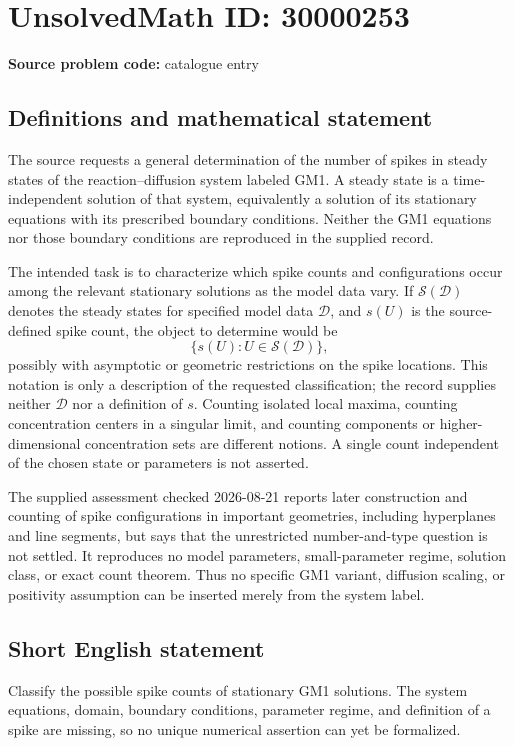 \documentclass[11pt]{article}
\begin{document}
\section*{UnsolvedMath ID: 30000253}
\textbf{Source problem code:} catalogue entry
\subsection{Definitions and mathematical statement}
The source requests a general determination of the number of spikes in steady states of the reaction--diffusion system labeled GM1. A steady state is a time-independent solution of that system, equivalently a solution of its stationary equations with its prescribed boundary conditions. Neither the GM1 equations nor those boundary conditions are reproduced in the supplied record.

The intended task is to characterize which spike counts and configurations occur among the relevant stationary solutions as the model data vary. If \(\mathcal S(\mathcal D)\) denotes the steady states for specified model data \(\mathcal D\), and \(s(U)\) is the source-defined spike count, the object to determine would be
\[
\{s(U):U\in\mathcal S(\mathcal D)\},
\]
possibly with asymptotic or geometric restrictions on the spike locations. This notation is only a description of the requested classification; the record supplies neither \(\mathcal D\) nor a definition of \(s\). Counting isolated local maxima, counting concentration centers in a singular limit, and counting components or higher-dimensional concentration sets are different notions. A single count independent of the chosen state or parameters is not asserted.

The supplied assessment checked 2026-08-21 reports later construction and counting of spike configurations in important geometries, including hyperplanes and line segments, but says that the unrestricted number-and-type question is not settled. It reproduces no model parameters, small-parameter regime, solution class, or exact count theorem. Thus no specific GM1 variant, diffusion scaling, or positivity assumption can be inserted merely from the system label.
\subsection{Short English statement}
Classify the possible spike counts of stationary GM1 solutions. The system equations, domain, boundary conditions, parameter regime, and definition of a spike are missing, so no unique numerical assertion can yet be formalized.
\end{document}
